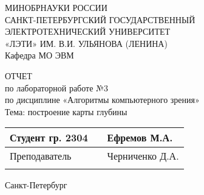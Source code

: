 \clearpage
\begin{center}	
	МИНОБРНАУКИ РОССИИ\\
	САНКТ-ПЕТЕРБУРГСКИЙ ГОСУДАРСТВЕННЫЙ\\
	ЭЛЕКТРОТЕХНИЧЕСКИЙ УНИВЕРСИТЕТ\\
	«ЛЭТИ» ИМ. В.И. УЛЬЯНОВА (ЛЕНИНА)\\
	Кафедра МО ЭВМ

	\vspace{54mm}

	ОТЧЕТ\\
	по лабораторной работе №3 \\
	по дисциплине «Алгоритмы компьютерного зрения» \\
	Тема: построение карты глубины\\

	\vspace{65mm}

	\def\arraystretch{1.5}
	\begin{tabularx}{\textwidth}{ >{\hsize=7cm}X >{\hsize=4.1cm}X  >{\centering\arraybackslash}X }
		Студент гр. 2304 & & Ефремов М.А. \\ \cline{2-2}
		Преподаватель & & Черниченко Д.А. \\ \cline{2-2}
	\end{tabularx}
	\def\arraystretch{1}

	\vfill
	Санкт-Петербург\\
	\the\year
\end{center}
\newpage
{}
\setcounter{page}{1}